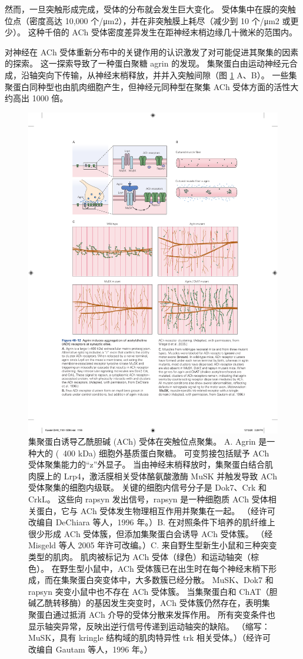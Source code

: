 然而，一旦突触形成完成，受体的分布就会发生巨大变化。 受体集中在膜的突触位点（密度高达 10,000 个/μm2），并在非突触膜上耗尽（减少到 10 个/μm2 或更少）。 这种千倍的 ACh 受体密度差异发生在距神经末梢边缘几十微米的范围内。

对神经在 ACh 受体重新分布中的关键作用的认识激发了对可能促进其聚集的因素的探索。 这一探索导致了一种蛋白聚糖 agrin 的发现。 
集聚蛋白由运动神经元合成，沿轴突向下传输，从神经末梢释放，并并入突触间隙（图 \ref{fig:48_12} A、B）。 
一些集聚蛋白同种型也由肌肉细胞产生，但神经元同种型在聚集 ACh 受体方面的活性大约高出 1000 倍。

\begin{figure}[htbp]
	\centering
	\includegraphics[width=0.8\linewidth]{chap48/fig_48_12}
	\caption{集聚蛋白诱导乙酰胆碱 (ACh) 受体在突触位点聚集。 A. Agrin 是一种大的 (~400 kDa) 细胞外基质蛋白聚糖。 可变剪接包括赋予 ACh 受体聚集能力的“z”外显子。 当由神经末梢释放时，集聚蛋白结合肌肉膜上的 Lrp4，激活膜相关受体酪氨酸激酶 MuSK 并触发导致 ACh 受体聚集的细胞内级联。 关键的细胞内信号分子是 Dok7、Crk 和 CrkL。 这些向 rapsyn 发出信号，rapsyn 是一种细胞质 ACh 受体相关蛋白，它与 ACh 受体发生物理相互作用并聚集在一起。 （经许可改编自 DeChiara 等人，1996 年。）B. 在对照条件下培养的肌纤维上很少形成 ACh 受体簇，但添加集聚蛋白会诱导 ACh 受体簇。 （经 Misgeld 等人 2005 年许可改编。）C. 来自野生型新生小鼠和三种突变类型的肌肉。 肌肉被标记为 ACh 受体（绿色）和运动轴突（棕色）。 在野生型小鼠中，ACh 受体簇已在出生时在每个神经末梢下形成，而在集聚蛋白突变体中，大多数簇已经分散。 MuSK、Dok7 和 rapsyn 突变小鼠中也不存在 ACh 受体簇。 当集聚蛋白和 ChAT（胆碱乙酰转移酶）的基因发生突变时，ACh 受体簇仍然存在，表明集聚蛋白通过抵消 ACh 介导的受体分散来发挥作用。 所有突变条件也显示轴突异常，反映出逆行信号传递到运动轴突的缺陷。 （缩写：MuSK，具有 kringle 结构域的肌肉特异性 trk 相关受体。）（经许可改编自 Gautam 等人，1996 年。）}
	\label{fig:48_12}
\end{figure}


